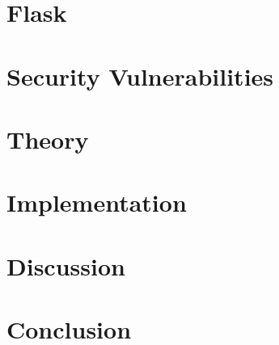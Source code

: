 \chapter{Flask}


\chapter{Security Vulnerabilities}


\chapter{Theory}
















\chapter{Implementation}













\chapter{Discussion}





\chapter{Conclusion}


\appendix







\printbibliography

